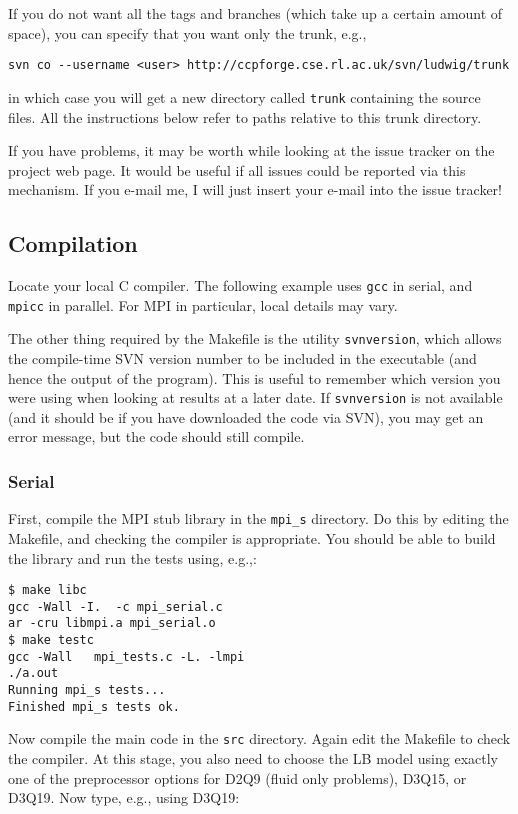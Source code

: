 If you do not want all the tags and branches (which take up a certain amount
of space), you can specify that you
want only the trunk, e.g.,
\begin{verbatim}
svn co --username <user> http://ccpforge.cse.rl.ac.uk/svn/ludwig/trunk
\end{verbatim}
in which case you will get a new directory called \texttt{trunk} containing
the source files. All the instructions below refer to paths relative to
this trunk directory.

If you have problems, it may be worth while looking at the issue
tracker on the project web page. It would be useful if all issues
could be reported via this mechanism. If you e-mail me, I will just
insert your e-mail into the issue tracker!

\subsection{Compilation}

Locate your local C compiler. The following example uses \texttt{gcc}
in serial, and \texttt{mpicc} in parallel. For MPI in particular,
local details may vary.

The other thing required by the Makefile is the utility
\texttt{svnversion}, which allows the compile-time SVN version number to
be included in the executable (and hence the output of the program). This
is useful to remember which version you were using when looking at
results at a later date. If
\texttt{svnversion} is not available (and it
should be if you have downloaded the code via SVN), you may get an
error message, but the code should still compile.

\subsubsection{Serial}

First, compile the MPI stub library in the \texttt{mpi\_s}
directory. Do this by editing the Makefile, and checking the compiler
is appropriate. You should be able to build the library and run the
tests using, e.g.,:

\begin{verbatim}
$ make libc
gcc -Wall -I.  -c mpi_serial.c
ar -cru libmpi.a mpi_serial.o
$ make testc
gcc -Wall   mpi_tests.c -L. -lmpi
./a.out
Running mpi_s tests...
Finished mpi_s tests ok.
\end{verbatim}

Now compile the main code in the \texttt{src} directory. Again
edit the Makefile to check the compiler. At this stage, you also
need to choose the LB model using exactly one of the preprocessor
options for D2Q9 (fluid only problems), D3Q15, or D3Q19. Now type,
e.g., using D3Q19:

